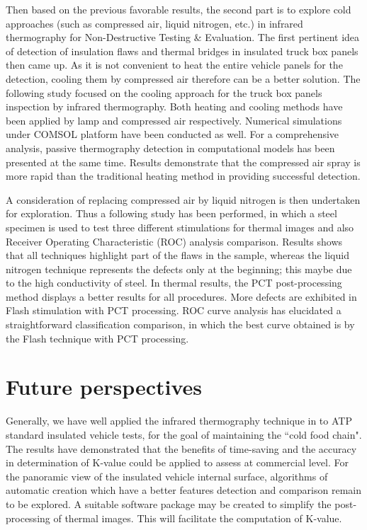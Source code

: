Then based on the previous favorable results, the second part is to explore cold approaches (such as compressed air, liquid nitrogen, etc.) in infrared thermography for Non-Destructive Testing \& Evaluation. The first pertinent idea of detection of insulation flaws and thermal bridges in insulated truck box panels then came up. As it is not convenient to heat the entire vehicle panels for the detection, cooling them by compressed air therefore can be a better solution. The following study focused on the cooling approach for the truck box panels inspection by infrared thermography. Both heating and cooling methods have been applied by lamp and compressed air respectively. Numerical simulations under COMSOL platform have been conducted as well. For a comprehensive analysis, passive thermography detection in computational models has been presented at the same time. Results demonstrate that the compressed air spray is more rapid than the traditional heating method in providing successful detection.

A consideration of replacing compressed air by liquid nitrogen is then undertaken for exploration. Thus a following study has been performed, in which a steel specimen is used to test three different stimulations for thermal images and also Receiver Operating Characteristic (ROC) analysis comparison. Results shows that all techniques highlight part of the flaws in the sample, whereas the liquid nitrogen technique represents the defects only at the beginning; this maybe due to the high conductivity of steel. In thermal results, the PCT post-processing method displays a better results for all procedures. More defects are exhibited in Flash stimulation with PCT processing. ROC curve analysis has elucidated a straightforward classification comparison, in which the best curve obtained is by the Flash technique with PCT processing. 



\section{Future perspectives}
Generally, we have well applied the infrared thermography technique in to ATP standard insulated vehicle tests, for the goal of maintaining the ``cold food chain". The results have demonstrated that the benefits of time-saving and the accuracy in determination of K-value could be applied to assess at commercial level.  For the panoramic view of the insulated vehicle internal surface, algorithms of automatic creation which have a better features detection and comparison remain to be explored. A suitable software package may be created to simplify the post-processing of thermal images. This will facilitate the computation of K-value.

